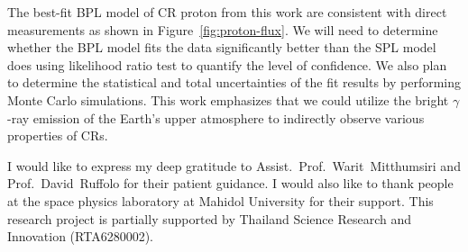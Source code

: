 The best-fit BPL model of CR proton from this work are consistent with direct
measurements as shown in Figure~\ref{fig:proton-flux}.
We will need to determine whether the BPL model fits the data significantly better
than the SPL model does using likelihood ratio test to quantify the level of
confidence. We also plan to determine the statistical and total uncertainties of
the fit results by performing Monte Carlo simulations.
This work emphasizes that we could utilize the bright $\gamma$-ray emission
of the Earth's upper atmosphere to indirectly observe various properties of CRs.


\par I would like to express my deep gratitude to 
Assist.~Prof.~Warit~Mitthumsiri and Prof.~David~Ruffolo for their patient guidance.
I would also like to thank people at the space physics laboratory at Mahidol University
for their support.
This research project is partially supported by Thailand Science Research
and Innovation (RTA6280002).

